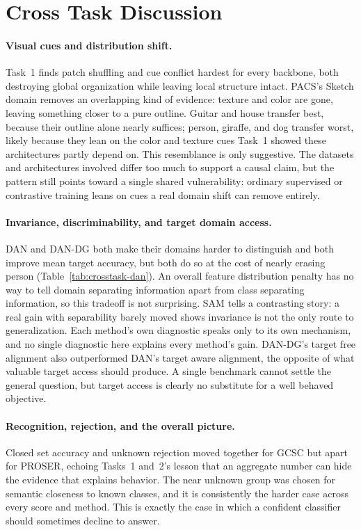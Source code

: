 \documentclass{article}
\begin{document}
\section{Cross Task Discussion}
\label{sec:cross}

\paragraph{Visual cues and distribution shift.}
Task~1 finds patch shuffling and cue conflict hardest for every backbone,
both destroying global organization while leaving local structure intact.
PACS's Sketch domain removes an overlapping kind of evidence: texture and
color are gone, leaving something closer to a pure outline. Guitar and
house transfer best, because their outline alone nearly suffices; person,
giraffe, and dog transfer worst, likely because they lean on the color
and texture cues Task~1 showed these architectures partly depend on. This
resemblance is only suggestive. The datasets and architectures involved
differ too much to support a causal claim, but the pattern still points
toward a single shared vulnerability: ordinary supervised or contrastive
training leans on cues a real domain shift can remove entirely.

\paragraph{Invariance, discriminability, and target domain access.}
DAN and DAN-DG both make their domains harder to distinguish and both
improve mean target accuracy, but both do so at the cost of nearly
erasing person (Table~\ref{tab:crosstask-dan}). An overall feature
distribution penalty has no way to tell domain separating information
apart from class separating information, so this tradeoff is not
surprising. SAM tells a contrasting story: a real gain
with separability barely moved shows invariance is not the only route to
generalization. Each method's own diagnostic speaks only to its own
mechanism, and no single diagnostic here explains every method's gain.
DAN-DG's
target free alignment also outperformed DAN's target aware alignment, the
opposite of what valuable target access should produce. A single
benchmark cannot settle the general question, but target access is
clearly no substitute for a well behaved objective.

\paragraph{Recognition, rejection, and the overall picture.}
Closed set accuracy and unknown rejection moved together for GCSC but
apart for PROSER, echoing Tasks~1 and~2's lesson that an aggregate number
can hide the evidence that explains behavior. The near unknown
group was chosen for semantic closeness to known classes, and it is
consistently the harder case across every score and method. This is
exactly the case in which a confident classifier should sometimes
decline to answer.
\end{document}

